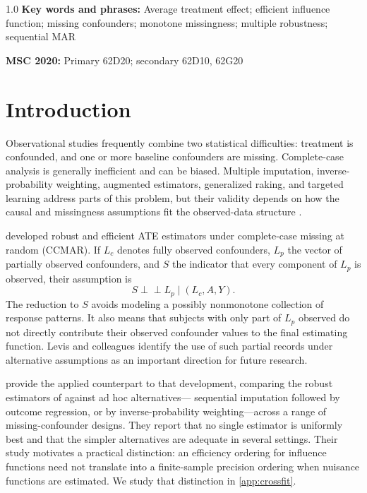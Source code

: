 \documentclass[11pt]{article}
\theoremstyle{definition}
\newcommand{\indep}{\perp\!\!\!\perp}
\newcommand{\1}{\mathbf{1}}
\begin{document}
\begin{spacing}{1.0}
\noindent\textbf{Key words and phrases:} Average treatment effect; efficient influence function; missing confounders; monotone missingness; multiple robustness; sequential MAR

\medskip
\noindent\textbf{MSC 2020:} Primary 62D20; secondary 62D10, 62G20

\end{spacing}
\clearpage

\section{Introduction}

Observational studies frequently combine two statistical difficulties: treatment is confounded, and one or more baseline confounders are missing. Complete-case analysis is generally inefficient and can be biased. Multiple imputation, inverse-probability weighting, augmented estimators, generalized raking, and targeted learning address parts of this problem, but their validity depends on how the causal and missingness assumptions fit the observed-data structure \citep{bang2005,williamson2012,seaman2014,levis2025,benz2025,williamson2026,wen2026}.

\citet{levis2025} developed robust and efficient ATE estimators under complete-case missing at random (CCMAR). If $L_c$ denotes fully observed confounders, $L_p$ the vector of partially observed confounders, and $S$ the indicator that every component of $L_p$ is observed, their assumption is
\[
S\indep L_p\mid (L_c,A,Y).
\]
The reduction to $S$ avoids modeling a possibly nonmonotone collection of response patterns. It also means that subjects with only part of $L_p$ observed do not directly contribute their observed confounder values to the final estimating function. Levis and colleagues identify the use of such partial records under alternative assumptions as an important direction for future research.

\citet{benz2025} provide the applied counterpart to that development, comparing
the robust estimators of \citet{levis2025} against ad hoc alternatives---%
sequential imputation followed by outcome regression, or by inverse-probability
weighting---across a range of missing-confounder designs. They report that no
single estimator is uniformly best and that the simpler alternatives are
adequate in several settings. Their study motivates a practical distinction: an efficiency ordering for influence functions need not translate into a finite-sample precision ordering when nuisance functions are estimated. We study that distinction in \cref{app:crossfit}.
\end{document}
